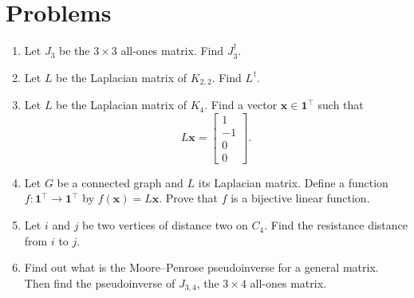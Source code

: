\documentclass{article}
\newcommand{\trans}{^\top}
\newcommand{\bone}{\mathbf{1}}
\newcommand{\bx}{\mathbf{x}}
\theoremstyle{definition}
\begin{document}
\section*{Problems}
\begin{enumerate}
\setlength\itemsep{2em}
\item Let $J_3$ be the $3\times 3$ all-ones matrix.  Find $J_3^\dagger$.   
\item Let $L$ be the Laplacian matrix of $K_{2,2}$.  Find $L^\dagger$.
\item Let $L$ be the Laplacian matrix of $K_4$.  Find a vector $\bx\in\bone\trans$ such that 
\[L\bx = \begin{bmatrix} 1 \\ -1 \\ 0 \\ 0 \end{bmatrix}.\]
\item Let $G$ be a connected graph and $L$ its Laplacian matrix.  Define a function $f:\bone\trans\rightarrow\bone\trans$ by $f(\bx) = L\bx$.  Prove that $f$ is a bijective linear function.
\item Let $i$ and $j$ be two vertices of distance two on $C_4$.  Find the resistance distance from $i$ to $j$.
\item Find out what is the Moore--Penrose pseudoinverse for a general matrix.  Then find the pseudoinverse of $J_{3,4}$, the $3\times 4$ all-ones matrix.
\end{enumerate}

\end{document}
